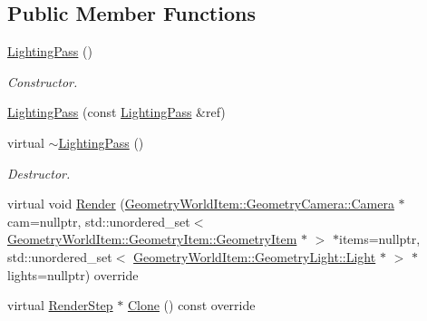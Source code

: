 \subsection*{Public Member Functions}
\begin{DoxyCompactItemize}
\item 
\mbox{\label{class_geometry_engine_1_1_geometry_render_step_1_1_lighting_pass_a5fb6ea8b19fe0067bfa89ef446934fc3}} 
\mbox{\hyperlink{class_geometry_engine_1_1_geometry_render_step_1_1_lighting_pass_a5fb6ea8b19fe0067bfa89ef446934fc3}{Lighting\+Pass}} ()
\begin{DoxyCompactList}\small\item\em Constructor. \end{DoxyCompactList}\item 
\mbox{\hyperlink{class_geometry_engine_1_1_geometry_render_step_1_1_lighting_pass_ab25f4db452340113c3ace2ab6994bd9f}{Lighting\+Pass}} (const \mbox{\hyperlink{class_geometry_engine_1_1_geometry_render_step_1_1_lighting_pass}{Lighting\+Pass}} \&ref)
\item 
\mbox{\label{class_geometry_engine_1_1_geometry_render_step_1_1_lighting_pass_a1170635cec58a539398cd93024974870}} 
virtual \mbox{\hyperlink{class_geometry_engine_1_1_geometry_render_step_1_1_lighting_pass_a1170635cec58a539398cd93024974870}{$\sim$\+Lighting\+Pass}} ()
\begin{DoxyCompactList}\small\item\em Destructor. \end{DoxyCompactList}\item 
virtual void \mbox{\hyperlink{class_geometry_engine_1_1_geometry_render_step_1_1_lighting_pass_ae6d9fa99f67e659839ca310947787f52}{Render}} (\mbox{\hyperlink{class_geometry_engine_1_1_geometry_world_item_1_1_geometry_camera_1_1_camera}{Geometry\+World\+Item\+::\+Geometry\+Camera\+::\+Camera}} $\ast$cam=nullptr, std\+::unordered\+\_\+set$<$ \mbox{\hyperlink{class_geometry_engine_1_1_geometry_world_item_1_1_geometry_item_1_1_geometry_item}{Geometry\+World\+Item\+::\+Geometry\+Item\+::\+Geometry\+Item}} $\ast$ $>$ $\ast$items=nullptr, std\+::unordered\+\_\+set$<$ \mbox{\hyperlink{class_geometry_engine_1_1_geometry_world_item_1_1_geometry_light_1_1_light}{Geometry\+World\+Item\+::\+Geometry\+Light\+::\+Light}} $\ast$ $>$ $\ast$lights=nullptr) override
\item 
virtual \mbox{\hyperlink{class_geometry_engine_1_1_geometry_render_step_1_1_render_step}{Render\+Step}} $\ast$ \mbox{\hyperlink{class_geometry_engine_1_1_geometry_render_step_1_1_lighting_pass_a4f1cb36c7bf6a90d0aa3b8e8feba5e5e}{Clone}} () const override
\end{DoxyCompactItemize}
